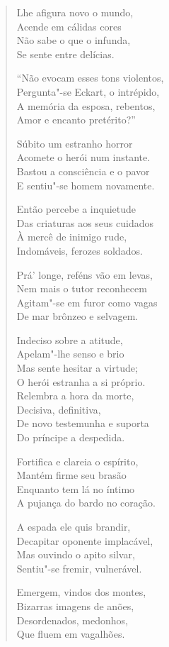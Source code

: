\begin{verse}
Lhe afigura novo o mundo,\\
Acende em cálidas cores\\
Não sabe o que o infunda,\\
Se sente entre delícias.
 
``Não evocam esses tons violentos,\\
Pergunta"-se Eckart, o intrépido,\\
A memória da esposa, rebentos,\\
Amor e encanto pretérito?''

Súbito um estranho horror\\
Acomete o herói num instante.\\
Bastou a consciência e o pavor\\
E sentiu"-se homem novamente.

Então percebe a inquietude\\
Das criaturas aos seus cuidados\\
À mercê de inimigo rude,\\
Indomáveis, ferozes soldados.

Prá' longe, reféns vão em levas,\\
Nem mais o tutor reconhecem\\
Agitam"-se em furor como vagas\\
De mar brônzeo e selvagem.

Indeciso sobre a atitude,\\
Apelam"-lhe senso e brio\\
Mas sente hesitar a virtude;\\
O herói estranha a si próprio.\\
Relembra a hora da morte,\\
Decisiva, definitiva,\\
De novo testemunha e suporta\\
Do príncipe a despedida.

Fortifica e clareia o espírito,\\
Mantém firme seu brasão\\
Enquanto tem lá no íntimo\\
A pujança do bardo no coração.
 
A espada ele quis brandir,\\
Decapitar oponente implacável,\\
Mas ouvindo o apito silvar,\\
Sentiu"-se fremir, vulnerável.

Emergem, vindos dos montes,\\
Bizarras imagens de anões,\\
Desordenados, medonhos,\\
Que fluem em vagalhões.


\end{verse}
